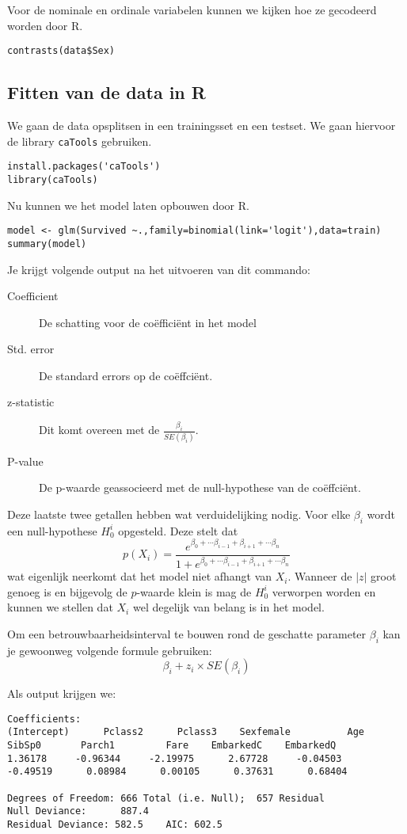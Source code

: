 Voor de nominale en ordinale variabelen kunnen we kijken hoe ze gecodeerd worden door R. 
\begin{lstlisting}
contrasts(data$Sex)
\end{lstlisting}

\subsection{Fitten van de data in R}
We gaan de data opsplitsen in een trainingsset en een testset. We gaan hiervoor de library \texttt{caTools} gebruiken. 

\begin{lstlisting}
install.packages('caTools')
library(caTools)
\end{lstlisting}

Nu kunnen we het model laten opbouwen door R.

\begin{lstlisting}
model <- glm(Survived ~.,family=binomial(link='logit'),data=train)
summary(model)
\end{lstlisting}

Je krijgt volgende output na het uitvoeren van dit commando:
\begin{description}
	\item[Coefficient] De schatting voor de co\"effici\"ent in het model
	\item[Std. error] De standard errors op de co\"effci\"ent. 
	\item[z-statistic] Dit komt overeen met de $\frac{\beta_i}{SE(\beta_i)}$. 
	\item[P-value] De p-waarde geassocieerd met de null-hypothese van de co\"effci\"ent. 
\end{description}
Deze laatste twee getallen hebben wat verduidelijking nodig. Voor elke $\beta_i$ wordt een null-hypothese $H^i_0$ opgesteld. Deze stelt dat 
\[ 
	p(X_i) = \frac{e^{\beta_0 + \cdots \beta_{i-1} + \beta_{i+1} + \cdots \beta_n}}{1+e^{\beta_0 + \cdots \beta_{i-1} + \beta_{i+1} + \cdots \beta_n}}
\]
wat eigenlijk neerkomt dat het model niet afhangt van $X_i$. Wanneer de $|z|$ groot genoeg is en bijgevolg de $p$-waarde klein is mag de $H^i_0$ verworpen worden en kunnen we stellen dat $X_i$ wel degelijk van belang is in het model. 

Om een betrouwbaarheidsinterval te bouwen rond de geschatte parameter $\beta_i$ kan je gewoonweg volgende formule gebruiken:
\[
	\beta_i +z_i  \times SE(\beta_i)
\]

Als output krijgen we:
\begin{lstlisting}
Coefficients:
(Intercept)      Pclass2      Pclass3    Sexfemale          Age       SibSp0       Parch1         Fare    EmbarkedC    EmbarkedQ  
1.36178     -0.96344     -2.19975      2.67728     -0.04503     -0.49519      0.08984      0.00105      0.37631      0.68404  

Degrees of Freedom: 666 Total (i.e. Null);  657 Residual
Null Deviance:	    887.4 
Residual Deviance: 582.5 	AIC: 602.5
\end{lstlisting}

